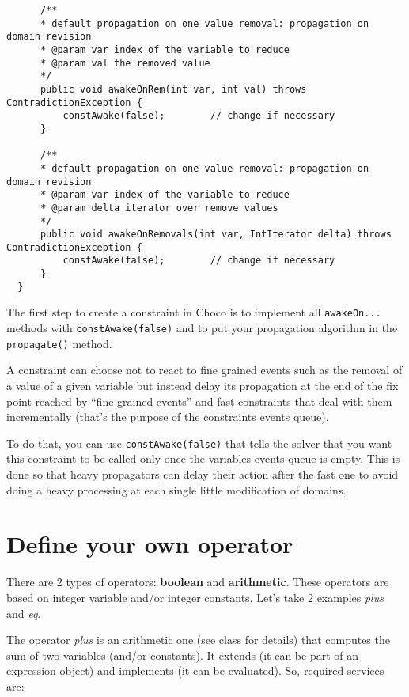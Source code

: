 \begin{lstlisting}
      /**
      * default propagation on one value removal: propagation on domain revision
      * @param var index of the variable to reduce
      * @param val the removed value
      */
      public void awakeOnRem(int var, int val) throws ContradictionException {
          constAwake(false);        // change if necessary
      }
	
      /**
      * default propagation on one value removal: propagation on domain revision
      * @param var index of the variable to reduce
      * @param delta iterator over remove values
      */
      public void awakeOnRemovals(int var, IntIterator delta) throws ContradictionException {
          constAwake(false);        // change if necessary
      }
  }
\end{lstlisting}

The first step to create a constraint in Choco is to implement all \texttt{awakeOn...} methods with \texttt{constAwake(false)} and to put your propagation algorithm in the \texttt{propagate()} method. 

A constraint can choose not to react to fine grained events such as the removal of a value of a given variable but instead delay its propagation at the end of the fix point reached by ``fine grained events'' and fast constraints that deal with them incrementally (that's the purpose of the constraints events queue). 

To do that, you can use \texttt{constAwake(false)} that tells the solver that you want this constraint to be called only once the variables events queue is empty. This is done so that heavy propagators can delay their action after the fast one to avoid doing a heavy processing at each single little modification of domains.

\section{Define your own operator}\label{advanced:defineyourownoperator}\hypertarget{advanced:defineyourownoperator}{}


There are 2 types of operators: \textbf{boolean} and \textbf{arithmetic}. These operators are based on integer variable and/or integer constants. 
Let's take 2 examples \textit{plus} and \textit{eq}.

The operator \textit{plus} is an arithmetic one (see   class for details) that computes the sum of two variables (and/or constants). It extends   (it can be part of an expression object) and implements   (it can be evaluated). So, required services are:

